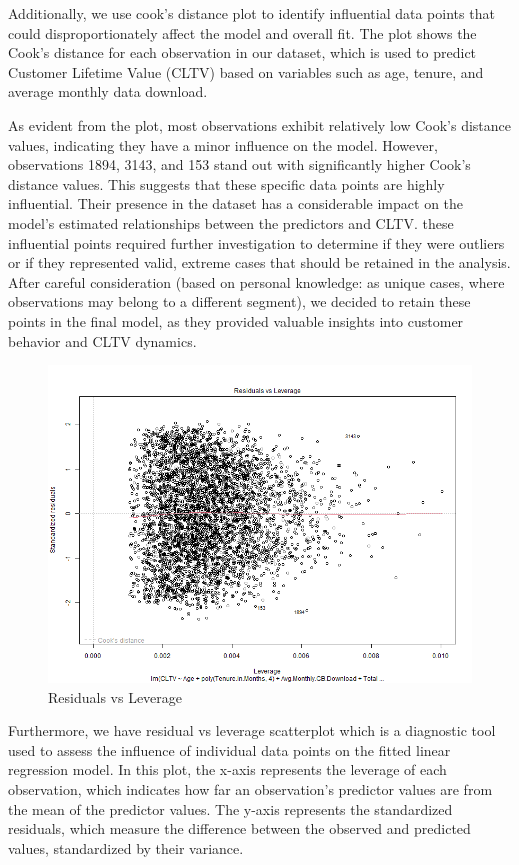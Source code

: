 \documentclass[
]{article}
\begin{document}
Additionally, we use cook's distance plot to identify influential data
points that could disproportionately affect the model and overall fit.
The plot shows the Cook's distance for each observation in our dataset,
which is used to predict Customer Lifetime Value (CLTV) based on
variables such as age, tenure, and average monthly data download.

As evident from the plot, most observations exhibit relatively low
Cook's distance values, indicating they have a minor influence on the
model. However, observations 1894, 3143, and 153 stand out with
significantly higher Cook's distance values. This suggests that these
specific data points are highly influential. Their presence in the
dataset has a considerable impact on the model's estimated relationships
between the predictors and CLTV. these influential points required
further investigation to determine if they were outliers or if they
represented valid, extreme cases that should be retained in the
analysis. After careful consideration (based on personal knowledge: as
unique cases, where observations may belong to a different segment), we
decided to retain these points in the final model, as they provided
valuable insights into customer behavior and CLTV dynamics.

\begin{figure}

{\centering \includegraphics[width=0.85\linewidth]{Plots/residuals_vs_leverage} 

}

\caption{Residuals vs Leverage}\label{fig:res-vs-lev-img}
\end{figure}

Furthermore, we have residual vs leverage scatterplot which is a
diagnostic tool used to assess the influence of individual data points
on the fitted linear regression model. In this plot, the x-axis
represents the leverage of each observation, which indicates how far an
observation's predictor values are from the mean of the predictor
values. The y-axis represents the standardized residuals, which measure
the difference between the observed and predicted values, standardized
by their variance.
\end{document}
